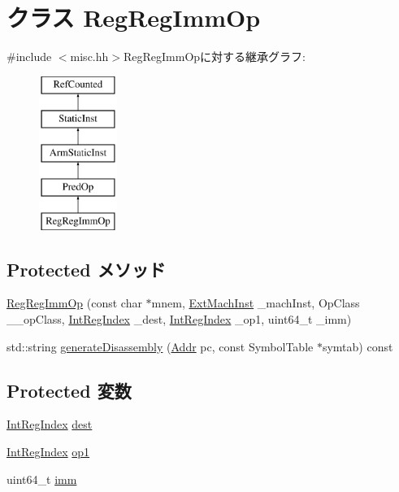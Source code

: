 \hypertarget{classRegRegImmOp}{
\section{クラス RegRegImmOp}
\label{classRegRegImmOp}
}


{\ttfamily \#include $<$misc.hh$>$}RegRegImmOpに対する継承グラフ:\begin{figure}[H]
\begin{center}
\leavevmode
\includegraphics[height=5cm]{classRegRegImmOp}
\end{center}
\end{figure}
\subsection*{Protected メソッド}
\begin{DoxyCompactItemize}
\item 
\hyperlink{classRegRegImmOp_a877a7ce0fe90e8d68be64602fde5b8b6}{RegRegImmOp} (const char $\ast$mnem, \hyperlink{classStaticInst_a5605d4fc727eae9e595325c90c0ec108}{ExtMachInst} \_\-machInst, OpClass \_\-\_\-opClass, \hyperlink{namespaceArmISA_ae64680ba9fb526106829d6bf92fc791b}{IntRegIndex} \_\-dest, \hyperlink{namespaceArmISA_ae64680ba9fb526106829d6bf92fc791b}{IntRegIndex} \_\-op1, uint64\_\-t \_\-imm)
\item 
std::string \hyperlink{classRegRegImmOp_a95d323a22a5f07e14d6b4c9385a91896}{generateDisassembly} (\hyperlink{classm5_1_1params_1_1Addr}{Addr} pc, const SymbolTable $\ast$symtab) const 
\end{DoxyCompactItemize}
\subsection*{Protected 変数}
\begin{DoxyCompactItemize}
\item 
\hyperlink{namespaceArmISA_ae64680ba9fb526106829d6bf92fc791b}{IntRegIndex} \hyperlink{classRegRegImmOp_aec72e8e45bdc87abeeeb75d2a8a9a716}{dest}
\item 
\hyperlink{namespaceArmISA_ae64680ba9fb526106829d6bf92fc791b}{IntRegIndex} \hyperlink{classRegRegImmOp_a4c465c43ad568f8bcf8ae71480e9cfea}{op1}
\item 
uint64\_\-t \hyperlink{classRegRegImmOp_a2b4406ad2843b5aa12d244d01d8fdc69}{imm}
\end{DoxyCompactItemize}


